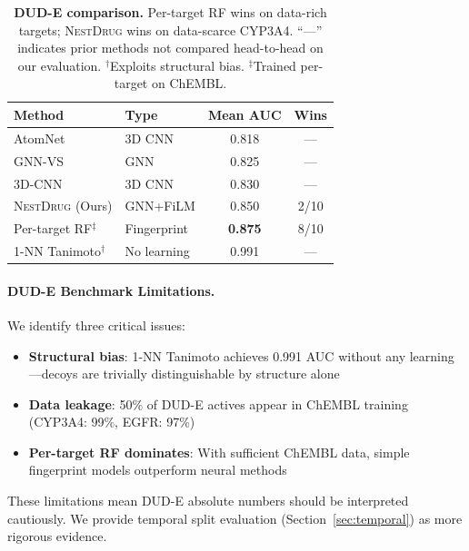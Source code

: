 \documentclass{article}
\newcommand{\methodname}{\textsc{NestDrug}}
\begin{document}
\begin{table}[t]
\vspace{-2mm}
\caption{\textbf{DUD-E comparison.} Per-target RF wins on data-rich targets; \methodname{} wins on data-scarce CYP3A4. ``---'' indicates prior methods not compared head-to-head on our evaluation. $^\dagger$Exploits structural bias. $^\ddagger$Trained per-target on ChEMBL.}
\label{tab:sota}
\centering
\small
\begin{tabular}{@{}llcc@{}}
\toprule
\textbf{Method} & \textbf{Type} & \textbf{Mean AUC} & \textbf{Wins} \\
\midrule
AtomNet \citep{wallach_2015_atomnet} & 3D CNN & 0.818 & --- \\
GNN-VS \citep{lim_2019_gnn_vs} & GNN & 0.825 & --- \\
3D-CNN \citep{ragoza_2017_3dcnn} & 3D CNN & 0.830 & --- \\
\methodname{} (Ours) & GNN+FiLM & 0.850 & 2/10 \\
Per-target RF$^\ddagger$ & Fingerprint & \textbf{0.875} & 8/10 \\
\midrule
1-NN Tanimoto$^\dagger$ & No learning & 0.991 & --- \\
\bottomrule
\end{tabular}
\vspace{-2mm}
\end{table}

\paragraph{DUD-E Benchmark Limitations.} We identify three critical issues:
\begin{itemize}[noitemsep,topsep=0pt]
\item \textbf{Structural bias}: 1-NN Tanimoto achieves 0.991 AUC without any learning---decoys are trivially distinguishable by structure alone \citep{wallach_2018_dude_bias}
\item \textbf{Data leakage}: 50\% of DUD-E actives appear in ChEMBL training (CYP3A4: 99\%, EGFR: 97\%)
\item \textbf{Per-target RF dominates}: With sufficient ChEMBL data, simple fingerprint models outperform neural methods
\end{itemize}
These limitations mean DUD-E absolute numbers should be interpreted cautiously. We provide temporal split evaluation (Section~\ref{sec:temporal}) as more rigorous evidence.
\end{document}
